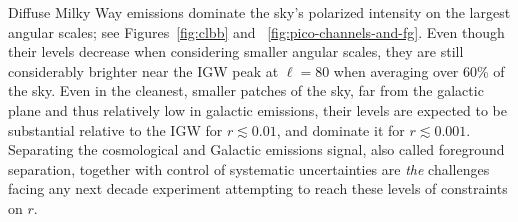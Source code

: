 \documentclass[PICOReport.tex]{subfiles}
\begin{document}

Diffuse Milky Way emissions dominate the sky's polarized intensity on the largest angular scales; see Figures~\ref{fig:clbb} and ~\ref{fig:pico-channels-and-fg}. Even though their levels decrease when considering smaller angular scales, they are still considerably brighter 
near the \ac{IGW} peak at $\ell=80$ when averaging over 60\% of the sky. 
Even in the cleanest, smaller patches of the sky, far from the galactic plane and thus relatively low in galactic emissions, their levels are expected to be substantial relative to the \ac{IGW} for $r \lesssim 0.01$, and dominate it for $r \lesssim0.001$. Separating the cosmological and Galactic emissions signal, also called foreground separation, together with control of systematic uncertainties are {\it the} challenges facing any next decade experiment attempting to reach these levels of constraints on $r$.
\end{document}
